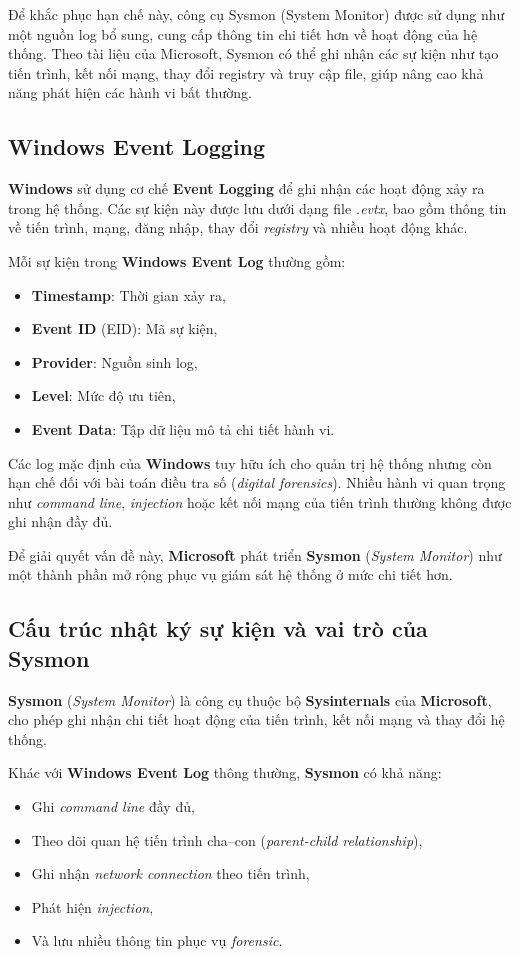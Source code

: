 \documentclass[../main.tex]{subfiles}
\begin{document}
Để khắc phục hạn chế này, công cụ Sysmon (System Monitor) được sử dụng như một nguồn log bổ sung, cung cấp thông tin chi tiết hơn về hoạt động của hệ thống. Theo tài liệu của Microsoft, Sysmon có thể ghi nhận các sự kiện như tạo tiến trình, kết nối mạng, thay đổi registry và truy cập file, giúp nâng cao khả năng phát hiện các hành vi bất thường.

\subsection{Windows Event Logging}
\label{section:2.1.1}
\textbf{Windows} sử dụng cơ chế \textbf{Event Logging} để ghi nhận các hoạt động xảy ra trong hệ thống. Các sự kiện này được lưu dưới dạng file \textit{.evtx}, bao gồm thông tin về tiến trình, mạng, đăng nhập, thay đổi \textit{registry} và nhiều hoạt động khác.

Mỗi sự kiện trong \textbf{Windows Event Log} thường gồm:
\begin{itemize}
    \item \textbf{Timestamp}: Thời gian xảy ra,
    \item \textbf{Event ID} (EID): Mã sự kiện,
    \item \textbf{Provider}: Nguồn sinh log,
    \item \textbf{Level}: Mức độ ưu tiên,
    \item \textbf{Event Data}: Tập dữ liệu mô tả chi tiết hành vi.
\end{itemize}

Các log mặc định của \textbf{Windows} tuy hữu ích cho quản trị hệ thống nhưng còn hạn chế đối với bài toán điều tra số (\textit{digital forensics}). Nhiều hành vi quan trọng như \textit{command line}, \textit{injection} hoặc kết nối mạng của tiến trình thường không được ghi nhận đầy đủ.

Để giải quyết vấn đề này, \textbf{Microsoft} phát triển \textbf{Sysmon} (\textit{System Monitor}) như một thành phần mở rộng phục vụ giám sát hệ thống ở mức chi tiết hơn.

\subsection{Cấu trúc nhật ký sự kiện và vai trò của Sysmon}
\label{subsection:2.1.2}
\textbf{Sysmon} (\textit{System Monitor}) là công cụ thuộc bộ \textbf{Sysinternals} của \textbf{Microsoft}, cho phép ghi nhận chi tiết hoạt động của tiến trình, kết nối mạng và thay đổi hệ thống.

Khác với \textbf{Windows Event Log} thông thường, \textbf{Sysmon} có khả năng:
\begin{itemize}
    \item Ghi \textit{command line} đầy đủ,
    \item Theo dõi quan hệ tiến trình cha–con (\textit{parent-child relationship}),
    \item Ghi nhận \textit{network connection} theo tiến trình,
    \item Phát hiện \textit{injection},
    \item Và lưu nhiều thông tin phục vụ \textit{forensic}.
\end{itemize}
\end{document}
